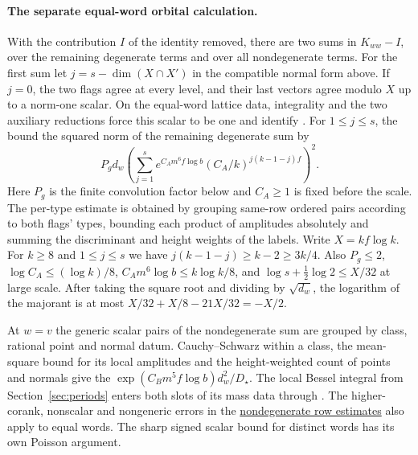 \paragraph{The separate equal-word orbital calculation.}
\leavevmode{}%
With the contribution \(I\) of the identity removed, there are two
sums in \(K_{ww}-I\), over the remaining degenerate terms and over
all nondegenerate terms. For the first sum let \(j=s-\dim(X\cap X')\)
in the compatible normal form above. If \(j=0\), the two flags agree
at every level, and their last vectors agree modulo \(X\) up to a
norm-one scalar. On the equal-word lattice data, integrality and the
two auxiliary reductions force this scalar to be one and identify
.
For \(1\le j\le s\), the
bound the squared norm of the remaining degenerate sum by
\[
 P_g d_w\left(\sum_{j=1}^s
 e^{C_A m^6 f\log b}(C_A/k)^{j(k-1-j)f}\right)^2 .
\]
Here \(P_g\) is the finite convolution factor below and \(C_A\ge1\)
is fixed before the scale. The per-type estimate is obtained by
grouping same-row ordered pairs according to both flags' types,
bounding each product of amplitudes absolutely and summing the
discriminant and height weights of the labels. Write \(X=kf\log k\).
For \(k\ge8\) and \(1\le j\le s\) we have
\(j(k-1-j)\ge k-2\ge3k/4\). Also \(P_g\le2\),
\(\log C_A\le(\log k)/8\), \(C_A m^6\log b\le k\log k/8\),
and \(\log s+\tfrac12\log2\le X/32\) at large scale. After taking
the square root and dividing by \(\sqrt{d_w}\), the logarithm
of the majorant is at most \(X/32+X/8-21X/32=-X/2\).

At \(w=v\) the generic scalar pairs of the nondegenerate sum are
grouped by class, rational point and normal datum. Cauchy--Schwarz
within a class, the mean-square bound for its local amplitudes and
the height-weighted count of points and normals give the
\(\exp(C_Bm^5f\log b)d_w^2/D_\star\). The local Bessel integral
from Section~\ref{sec:periods} enters both slots of its mass data through
.
The higher-corank, nonscalar and nongeneric errors in the
\hyperlink{proof.orbital-error-estimates}{nondegenerate row estimates}
also apply to equal words. The sharp signed scalar bound for
distinct words has its own Poisson argument.

